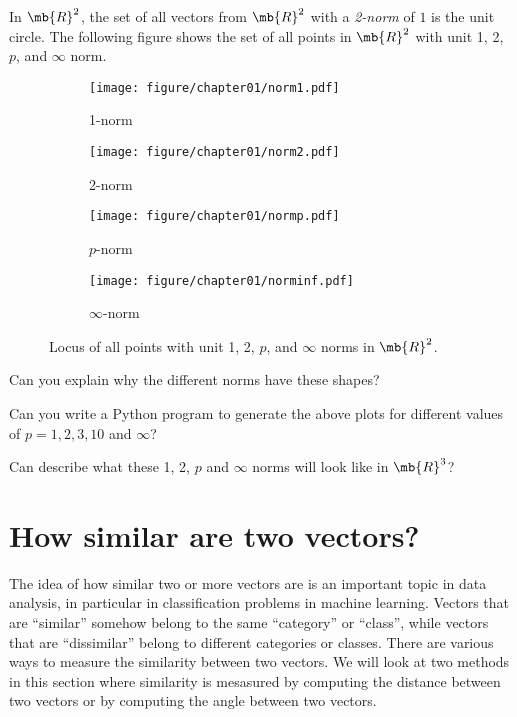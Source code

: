 In $\mb{R}^2$, the set of all vectors from $\mb{R}^2$ with a \textit{2-norm} of $1$ is the unit circle. The following figure shows the set of all points in $\mb{R}^2$ with unit 1, 2, $p$, and $\infty$ norm.
\begin{figure}[h]
    \centering
    \begin{subfigure}[b]{0.24\textwidth}
        \texttt{[image: figure/chapter01/norm1.pdf]}
        \caption{1-norm}
        \label{fig:ch01-norm1}
    \end{subfigure}
    \begin{subfigure}[b]{0.24\textwidth}
        \centering
        \texttt{[image: figure/chapter01/norm2.pdf]}
        \caption{2-norm}
        \label{fig:ch01-norm2}
    \end{subfigure}
    \begin{subfigure}[b]{0.24\textwidth}
        \centering
        \texttt{[image: figure/chapter01/normp.pdf]}
        \caption{$p$-norm}
        \label{fig:ch01-normp}
    \end{subfigure}
    \begin{subfigure}[b]{0.24\textwidth}
        \centering
        \texttt{[image: figure/chapter01/norminf.pdf]}
        \caption{$\infty$-norm}
        \label{fig:ch01-norminf}
    \end{subfigure}
    \caption{Locus of all points with unit 1, 2, $p$, and $\infty$ norms in $\mb{R}^2$.}
\end{figure}

\begin{boxedstuff}
    \begin{problem}
        Can you explain why the different norms have these shapes? 
    \end{problem}
    \begin{problem}
        Can you write a Python program to generate the above plots for different values of $p = 1, 2, 3, 10$ and $\infty$?
    \end{problem}
    \begin{problem}
        Can describe what these 1, 2, $p$ and $\infty$ norms will look like in $\mb{R}^3$?
    \end{problem}
\end{boxedstuff}

\section{How similar are two vectors?}\label{sec:ch01-similar-vecs}
The idea of how similar two or more vectors are is an important topic  in data analysis, in particular in classification problems in machine learning. Vectors that are ``similar'' somehow belong to the same ``category'' or ``class'', while vectors that are ``dissimilar'' belong to different categories or classes. There are various ways to measure the similarity between two vectors. We will look at two methods in this section where similarity is mesasured by computing the distance between two vectors or by computing the angle between two vectors.

